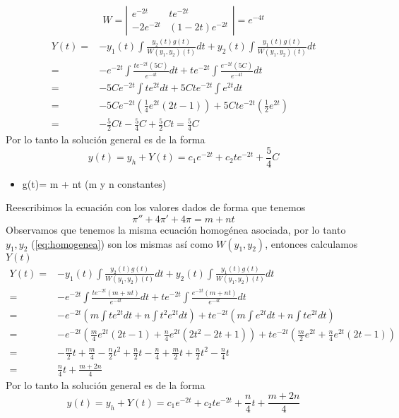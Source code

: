 $$ W = \left|
\begin{array}{cc}
  e^{-2t}   &  te^{-2t}\\
   -2e^{-2t} & (1-2t)e^{-2t}
\end{array}
\right| = e^{-4t}
$$
\smallskip
\begin{equation*}
\begin{split}
     Y(t)=&-y_{1}(t) \int \frac{y_{2}(t)g(t)}{W(y_{1},y_{2})(t)} dt + y_{2}(t) \int \frac{y_{1}(t)g(t)}{W(y_{1},y_{2})(t)} dt \\
    =& -e^{-2t} \int \frac{te^{-2t}(5C)}{e^{-4t}} dt + te^{-2t} \int \frac{e^{-2t}(5C)}{e^{-4t}} dt\\
    =& -5C e^{-2t} \int te^{2t}dt + 5C te^{-2t} \int e^{2t} dt\\
    =& -5C e^{-2t} (\frac{1}{4}e^{2t}(2t -1)) + 5C te^{-2t} (\frac{1}{2}e^{2t}) \\
    =& -\frac{5}{2}Ct -\frac{5}{4}C  + \frac{5}{2}Ct = \frac{5}{4}C
\end{split}
\end{equation*}
Por lo tanto la solución general es de la forma 
\begin{equation*}
    y(t)= y_{h} + Y(t) = c_{1}e^{-2t} + c_{2}te^{-2t} + \frac{5}{4}C
\end{equation*}
\begin{itemize}
    \item g(t)= m + nt  (m y n constantes) 
\end{itemize}

Reescribimos la ecuación con los valores dados de forma que tenemos
\begin{equation}
    \pi'' + 4\pi' + 4\pi = m + nt
\end{equation}
Observamos que tenemos la misma ecuación homogénea asociada, por lo tanto $y_{1}, y_{2}$ (\ref{eq:homogenea}) son los mismas así como $W(y_{1},y_{2})$, entonces calculamos $Y(t)$
\begin{equation*}
    \begin{split}
        Y(t)=&-y_{1}(t) \int \frac{y_{2}(t)g(t)}{W(y_{1},y_{2})(t)} dt + y_{2}(t) \int \frac{y_{1}(t)g(t)}{W(y_{1},y_{2})(t)} dt \\
    =& -e^{-2t} \int \frac{te^{-2t}(m + nt)}{e^{-4t}} dt + te^{-2t} \int \frac{e^{-2t}(m + nt)}{e^{-4t}} dt\\
    =& -e^{-2t} ( m\int te^{2t}dt + n\int t^{2} e^{2t}dt )+  te^{-2t} (m\int e^{2t} dt + n\int te^{2t}dt) \\
    =& -e^{-2t} (\frac{m}{4}e^{2t}(2t -1) + \frac{n}{4}e^{2t}(2t^{2}- 2t +1)) + te^{-2t} (\frac{m}{2}e^{2t} + \frac{n}{4}e^{2t}(2t -1) )  \\
    =& -\frac{m}{2}t + \frac{m}{4} - \frac{n}{2}t^{2} + \frac{n}{2}t - \frac{n}{4} + \frac{m}{2}t + \frac{n}{2}t^{2} - \frac{n}{4}t \\
    =& \frac{n}{4}t + \frac{m+ 2n}{4}
    \end{split}
\end{equation*}
Por lo tanto la solución general es de la forma 
\begin{equation*}
    y(t)= y_{h} + Y(t) = c_{1}e^{-2t} + c_{2}te^{-2t} + \frac{n}{4}t + \frac{m+ 2n}{4}
\end{equation*}